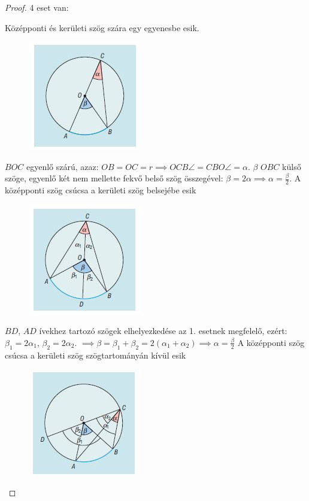 \documentclass[twoside,12pt]{report}
\theoremstyle{definition}
\begin{document}
	\begin{proof}
		4 eset van:
		\begin{outline}[enumerate]
			\1 Középponti és kerületi szög szára egy egyenesbe esik.
				\begin{figure}[H]
					\centering
					\includegraphics[width=0.4\linewidth]{1sz}
				\end{figure}
				\2 $BOC$ egyenlő szárú, azaz: $OB=OC=r\implies OCB\angle=CBO\angle=\alpha$.
				\2 $\beta$ $OBC$ külső szöge, egyenlő két nem mellette fekvő belső szög összegével: $\beta=2\alpha\implies\alpha=\frac{\beta}{2}$.
			\1 A középponti szög csúcsa a kerületi szög belsejébe esik
				\begin{figure}[H]
					\centering
					\includegraphics[width=0.4\linewidth]{2sz}
				\end{figure}
				\2 $BD$, $AD$ ívekhez tartozó szögek elhelyezkedése az 1. esetnek megfelelő, ezért: $\beta_1=2\alpha_1$, $\beta_2=2\alpha_2$.
				\2 $\implies \beta=\beta_1+\beta_2=2(\alpha_1+\alpha_2)\implies\alpha=\frac{\beta}{2}$
			\1 A középponti szög csúcsa a kerületi szög szögtartományán kívül esik
				\begin{figure}[H]
					\centering
					\includegraphics[width=0.4\linewidth]{3sz}

\end{figure}
\end{outline}
\end{proof}
\end{document}
